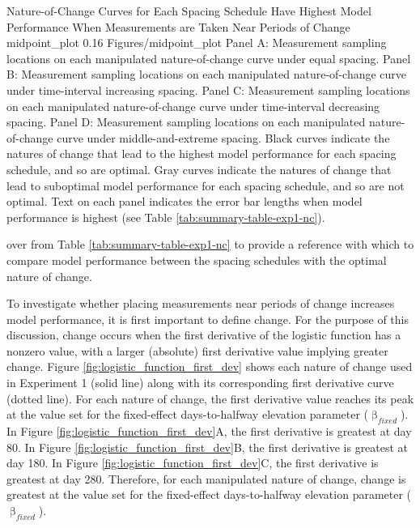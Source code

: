 \documentclass[
12pt, %
twoside,
english]{guelphthesis}
\begin{document}
\begin{apaFigure}
[portrait]
[samepage]
[0cm]
{Nature-of-Change Curves for Each Spacing Schedule Have Highest Model Performance When Measurements are Taken Near Periods of Change}
{midpoint_plot}
{0.16}
{Figures/midpoint_plot}
{Panel A: Measurement sampling locations on each manipulated nature-of-change curve under equal spacing. Panel B: Measurement sampling locations on each manipulated nature-of-change curve under time-interval increasing spacing. Panel C: Measurement sampling locations on each manipulated nature-of-change curve under time-interval decreasing spacing. Panel D: Measurement sampling locations on each manipulated nature-of-change curve under middle-and-extreme spacing. Black curves indicate the natures of change that lead to the highest model performance for each spacing schedule, and so are optimal. Gray curves indicate the natures of change that lead to suboptimal model performance for each spacing schedule, and so are not optimal. Text on each panel indicates the error bar lengths when model performance is highest (see Table \ref{tab:summary-table-exp1-nc}).}
\end{apaFigure}
\noindent over from Table \ref{tab:summary-table-exp1-nc} to provide a reference with which to compare model performance between the spacing schedules with the optimal nature of change.

To investigate whether placing measurements near periods of change increases model performance, it is first important to define change. For the purpose of this discussion, change occurs when the first derivative of the logistic function has a nonzero value, with a larger (absolute) first derivative value implying greater change. Figure \ref{fig:logistic_function_first_dev} shows each nature of change used in Experiment 1 (solid line) along with its corresponding first derivative curve (dotted line). For each nature of change, the first derivative value reaches its peak at the value set for the fixed-effect days-to-halfway elevation parameter (\(\upbeta_{fixed}\)). In Figure \ref{fig:logistic_function_first_dev}A, the first derivative is greatest at day 80. In Figure \ref{fig:logistic_function_first_dev}B, the first derivative is greatest at day 180. In Figure \ref{fig:logistic_function_first_dev}C, the first derivative is greatest at day 280. Therefore, for each manipulated nature of change, change is greatest at the value set for the fixed-effect days-to-halfway elevation parameter (\(\upbeta_{fixed}\)).
\end{document}

